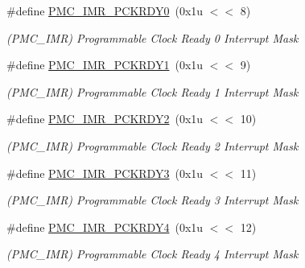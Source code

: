 \begin{DoxyCompactItemize}
\mbox{\label{group__SAMV71__PMC_ga31f003d970a773e7eb1649c26aed0a68}} 
\#define \mbox{\hyperlink{group__SAMV71__PMC_ga31f003d970a773e7eb1649c26aed0a68}{P\+M\+C\+\_\+\+I\+M\+R\+\_\+\+P\+C\+K\+R\+D\+Y0}}~(0x1u $<$$<$ 8)
\begin{DoxyCompactList}\small\item\em (P\+M\+C\+\_\+\+I\+MR) Programmable Clock Ready 0 Interrupt Mask \end{DoxyCompactList}\item 
\mbox{\label{group__SAMV71__PMC_gac34959a795514620271d158871cf835d}} 
\#define \mbox{\hyperlink{group__SAMV71__PMC_gac34959a795514620271d158871cf835d}{P\+M\+C\+\_\+\+I\+M\+R\+\_\+\+P\+C\+K\+R\+D\+Y1}}~(0x1u $<$$<$ 9)
\begin{DoxyCompactList}\small\item\em (P\+M\+C\+\_\+\+I\+MR) Programmable Clock Ready 1 Interrupt Mask \end{DoxyCompactList}\item 
\mbox{\label{group__SAMV71__PMC_ga900f4f1c6b07e3713ce4a4935eea5fee}} 
\#define \mbox{\hyperlink{group__SAMV71__PMC_ga900f4f1c6b07e3713ce4a4935eea5fee}{P\+M\+C\+\_\+\+I\+M\+R\+\_\+\+P\+C\+K\+R\+D\+Y2}}~(0x1u $<$$<$ 10)
\begin{DoxyCompactList}\small\item\em (P\+M\+C\+\_\+\+I\+MR) Programmable Clock Ready 2 Interrupt Mask \end{DoxyCompactList}\item 
\mbox{\label{group__SAMV71__PMC_gaaeeb62343adc85408c5d94b90934b297}} 
\#define \mbox{\hyperlink{group__SAMV71__PMC_gaaeeb62343adc85408c5d94b90934b297}{P\+M\+C\+\_\+\+I\+M\+R\+\_\+\+P\+C\+K\+R\+D\+Y3}}~(0x1u $<$$<$ 11)
\begin{DoxyCompactList}\small\item\em (P\+M\+C\+\_\+\+I\+MR) Programmable Clock Ready 3 Interrupt Mask \end{DoxyCompactList}\item 
\mbox{\label{group__SAMV71__PMC_ga0223426b2d009e27a00a9da99dfa5670}} 
\#define \mbox{\hyperlink{group__SAMV71__PMC_ga0223426b2d009e27a00a9da99dfa5670}{P\+M\+C\+\_\+\+I\+M\+R\+\_\+\+P\+C\+K\+R\+D\+Y4}}~(0x1u $<$$<$ 12)
\begin{DoxyCompactList}\small\item\em (P\+M\+C\+\_\+\+I\+MR) Programmable Clock Ready 4 Interrupt Mask \end{DoxyCompactList}\item 
$$
\end{DoxyCompactItemize}
